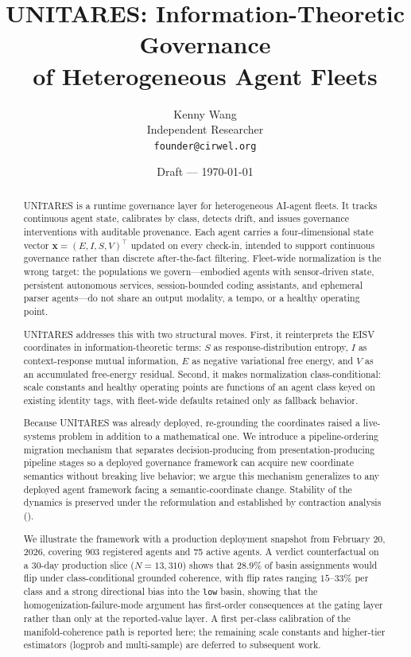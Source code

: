 \documentclass[11pt,twocolumn]{article}
\title{UNITARES: Information-Theoretic Governance\\
of Heterogeneous Agent Fleets}
\author{
  Kenny Wang\\
  Independent Researcher\\
  \texttt{founder@cirwel.org}
}
\date{Draft --- \today}
\newcommand{\eisv}{\ensuremath{\mathbf{x}}}
\begin{document}
\maketitle

\begin{abstract}
UNITARES is a runtime governance layer for heterogeneous AI-agent
fleets. It tracks continuous agent state, calibrates by class,
detects drift, and issues governance interventions with auditable
provenance. Each agent carries a four-dimensional state vector
$\eisv = (E, I, S, V)^\top$ updated on every check-in, intended to
support continuous governance rather than discrete after-the-fact
filtering. Fleet-wide normalization is the wrong target: the
populations we govern---embodied agents with sensor-driven state,
persistent autonomous services, session-bounded coding assistants,
and ephemeral parser agents---do not share an output modality, a
tempo, or a healthy operating point.

UNITARES addresses this with two structural moves. First, it
reinterprets the EISV coordinates in information-theoretic terms:
$S$ as response-distribution entropy, $I$ as context-response
mutual information, $E$ as negative variational free energy, and
$V$ as an accumulated free-energy residual. Second, it makes
normalization class-conditional: scale constants and healthy
operating points are functions of an agent class keyed on
existing identity tags, with fleet-wide defaults retained only as
fallback behavior.

Because UNITARES was already deployed, re-grounding the
coordinates raised a live-systems problem in addition to a
mathematical one. We introduce a pipeline-ordering migration
mechanism that separates decision-producing from
presentation-producing pipeline stages so a deployed governance
framework can acquire new coordinate semantics without breaking
live behavior; we argue this mechanism generalizes to any
deployed agent framework facing a semantic-coordinate change.
Stability of the dynamics is preserved under the reformulation
and established by contraction analysis ().

We illustrate the framework with a production deployment snapshot from
February 20, 2026, covering 903 registered agents and 75 active agents.
A verdict counterfactual on a 30-day production slice
($N = 13{,}310$) shows that $28.9\%$ of basin assignments would flip
under class-conditional grounded coherence, with flip rates ranging
$15$--$33\%$ per class and a strong directional bias into the
\texttt{low} basin, showing that the homogenization-failure-mode
argument has first-order consequences at the gating layer rather
than only at the reported-value layer. A first per-class calibration
of the manifold-coherence path is reported here; the remaining scale
constants and higher-tier estimators (logprob and multi-sample) are
deferred to subsequent work.
\end{abstract}
\end{document}
